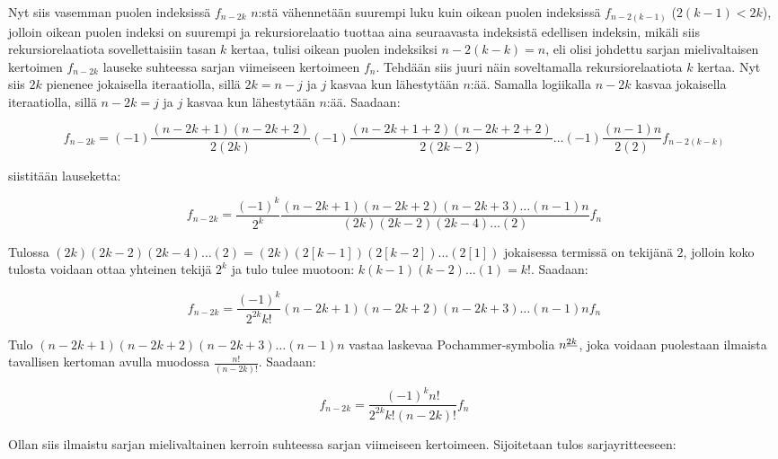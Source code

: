 \documentclass[../johdoksia.tex]{subfiles}
\begin{document}
	Nyt siis vasemman puolen indeksissä $f_{n - 2k}$ $n$:stä vähennetään suurempi luku kuin oikean puolen indeksissä $f_{n - 2(k - 1)}$ ($2(k - 1) < 2k$), jolloin oikean puolen indeksi on suurempi ja rekursiorelaatio tuottaa aina seuraavasta indeksistä edellisen indeksin, mikäli siis rekursiorelaatiota sovellettaisiin tasan $k$ kertaa, tulisi oikean puolen indeksiksi $n - 2(k - k) = n$, eli olisi johdettu sarjan mielivaltaisen kertoimen $f_{n - 2k}$ lauseke suhteessa sarjan viimeiseen kertoimeen $f_n$. Tehdään siis juuri näin soveltamalla rekursiorelaatiota $k$ kertaa. Nyt siis $2k$ pienenee jokaisella iteraatiolla, sillä $2k = n - j$ ja $j$ kasvaa kun lähestytään $n$:ää. Samalla logiikalla $n - 2k$ kasvaa jokaisella iteraatiolla, sillä $n - 2k = j$ ja $j$ kasvaa kun lähestytään $n$:ää. Saadaan:
	
	\begin{equation*}
		f_{n - 2k} = (-1)\frac{(n - 2k + 1)(n - 2k + 2)}{2(2k)}(-1)\frac{(n - 2k + 1 + 2)(n - 2k + 2 + 2)}{2(2k - 2)}\dots(-1)\frac{(n - 1)n}{2(2)}f_{n - 2(k - k)}
	\end{equation*}

	\noindent siistitään lauseketta:
	
	\begin{equation*}
		f_{n - 2k} = \frac{(-1)^k}{2^k}\frac{(n - 2k + 1)(n - 2k + 2)(n - 2k + 3)\dots(n - 1)n}{(2k)(2k - 2)(2k - 4)\dots(2)}f_n
	\end{equation*}
	
	\noindent Tulossa $(2k)(2k - 2)(2k - 4)\dots(2) = (2k)(2[k - 1])(2[k - 2])\dots(2[1])$ jokaisessa termissä on tekijänä $2$, jolloin koko tulosta voidaan ottaa yhteinen tekijä $2^k$ ja tulo tulee muotoon: $k(k - 1)(k - 2)\dots (1) = k!$. Saadaan:
	
	\begin{equation*}
		f_{n - 2k} = \frac{(-1)^k}{2^{2k} k!}(n - 2k + 1)(n - 2k + 2)(n - 2k + 3)\dots(n - 1)nf_n
	\end{equation*}

	\noindent Tulo $(n - 2k + 1)(n - 2k + 2)(n - 2k + 3)\dots(n - 1)n$ vastaa laskevaa Pochammer-symbolia $n^{\underline{2k}}$, joka voidaan puolestaan ilmaista tavallisen kertoman avulla muodossa $\frac{n!}{(n - 2k)!}$. Saadaan:
	
	\begin{equation*}
		f_{n - 2k} = \frac{(-1)^k n!}{2^{2k} k!(n - 2k)!}f_n
	\end{equation*}

	Ollan siis ilmaistu sarjan mielivaltainen kerroin suhteessa sarjan viimeiseen kertoimeen. Sijoitetaan tulos sarjayritteeseen:
	
\end{document}
